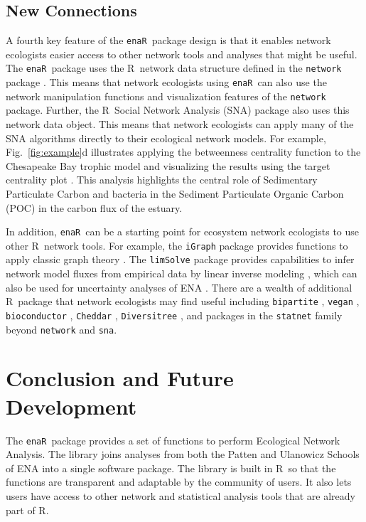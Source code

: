 \documentclass[11pt]{article}
\newcommand{\R}{R}
\newcommand{\enaR}{\texttt{enaR}}
\begin{document}
\begin{spacing}{2}
\subsection{New Connections}
A fourth key feature of the \enaR\ package design is that it enables
network ecologists easier access to other network tools and analyses
that might be useful.  The \enaR\ package uses the \R\ network data
structure defined in the \texttt{network} package
\citep{butts08_network}.  This means that network ecologists using \enaR\
can also use the network manipulation functions and visualization
features of the \texttt{network} package. Further, the \R\ Social
Network Analysis (SNA) package \citep{butts08_social} also uses this
network data object.  This means that network ecologists can apply
many of the SNA algorithms directly to their ecological network
models.  For example, Fig.~\ref{fig:example}d illustrates applying the betweenness
centrality function to the Chesapeake Bay trophic model
\citep{baird89} and visualizing the results using the target
centrality plot \citep{brandes03}.  This analysis highlights the
central role of Sedimentary Particulate Carbon and bacteria in the
Sediment Particulate Organic Carbon (POC) in the carbon flux of the
estuary.

In addition, \enaR\ can be a starting point for ecosystem network
ecologists to use other \R\ network tools.  For example, the
\texttt{iGraph} package provides functions to apply classic graph
theory \citep{csardi06}.  The \texttt{limSolve} package provides
capabilities to infer network model fluxes from empirical data by
linear inverse modeling \citep{soetaert09}, which can also be used for
uncertainty analyses of ENA \citep{kones09}. There are a wealth of
additional \R\ package that network ecologists may find useful
including \texttt{bipartite} \citep{dormann2008}, \texttt{vegan}
\citep{dixon2003vegan}, \texttt{bioconductor}
\citep{gentleman2004bioconductor}, \texttt{Cheddar}
\citep{hudson2013}, \texttt{Diversitree} \citep{fitzjohn2012}, and
packages in the \texttt{statnet} family \citep{handcock2008statnet}
beyond \texttt{network} and \texttt{sna}.

\section{Conclusion and Future Development}

The \enaR\ package provides a set of functions to perform Ecological
Network Analysis.  The library joins analyses from both the Patten and
Ulanowicz Schools of ENA into a single software package.  The library
is built in \R\ so that the functions are transparent and adaptable by
the community of users.  It also lets users have access to other
network and statistical analysis tools that are already part of \R.  


\end{spacing}
\end{document}
